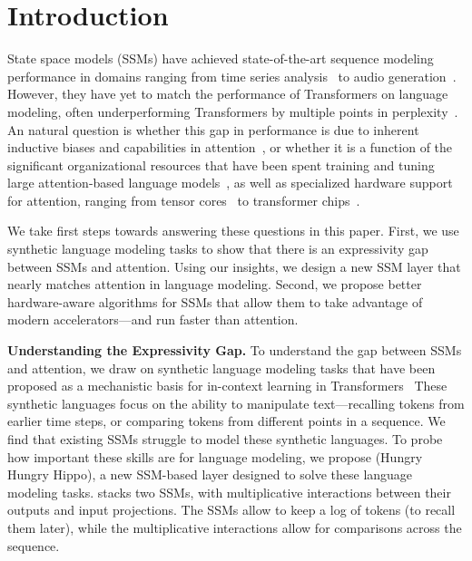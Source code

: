 
\section{Introduction}
\label{sec:intro}

State space models (SSMs) have achieved state-of-the-art sequence modeling performance in domains ranging from time series analysis~\citep{gu2022efficiently} to audio generation~\citep{goel2022s}.
However, they have yet to match the performance of Transformers on language modeling, often underperforming Transformers by multiple points in perplexity~\citep{gu2022efficiently}.
An natural question is whether this gap in performance is due to inherent inductive biases and capabilities in attention~\citep{edelman2022inductive,olsson2022context}, or whether it is a function of the significant organizational resources that have been spent training and tuning large attention-based language models~\citep{chowdhery2022palm,hoffmann2022training,zhang2022opt}, as well as specialized hardware support for attention, ranging from tensor cores~\citep{nvidia2017nvidia} to transformer chips~\citep{nvidia2022nvidia,kao2021optimized}.

We take first steps towards answering these questions in this paper.
First, we use synthetic language modeling tasks to show that there is an expressivity gap between SSMs and attention.
Using our insights, we design a new SSM layer that nearly matches attention in language modeling.
Second, we propose better hardware-aware algorithms for SSMs that allow them to take advantage of modern accelerators---and run faster than attention.



\textbf{Understanding the Expressivity Gap.}
To understand the gap between SSMs and attention, we draw on synthetic language modeling tasks that have been proposed as a mechanistic basis for in-context learning in Transformers~\citep{olsson2022context}
These synthetic languages focus on the ability to manipulate text---recalling tokens from earlier time steps, or comparing tokens from different points in a sequence.
We find that existing SSMs struggle to model these synthetic languages.
To probe how important these skills are for language modeling, we propose \hthree (Hungry Hungry Hippo), a new SSM-based layer designed to solve these language modeling tasks.
\hthree stacks two SSMs, with multiplicative interactions between their outputs and input projections.
The SSMs allow \hthree to keep a log of tokens (to recall them later), while the multiplicative interactions allow for comparisons across the sequence.

